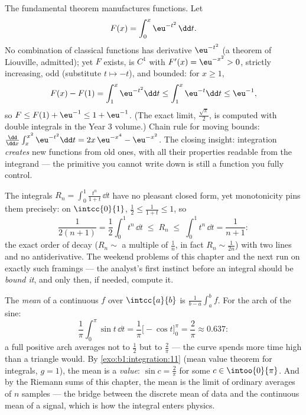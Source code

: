 \begin{example}\label{ex:b1:integration:definedby}
The fundamental theorem manufactures functions. Let
\[
F(x) = \int_0^x \eu^{-t^2}\,\dd t .
\]
No combination of classical functions has derivative
$\eu^{-t^2}$ (a theorem of Liouville, admitted); yet $F$ exists,
is $C^1$ with $F'(x) = \eu^{-x^2} > 0$, strictly increasing, odd
(substitute $t \mapsto -t$), and bounded: for $x \geq 1$,
\[
F(x) - F(1) = \int_1^x \eu^{-t^2}\dd t
\leq \int_1^x \eu^{-t}\dd t \leq \eu^{-1} ,
\]
so $F \leq F(1) + \eu^{-1} \leq 1 + \eu^{-1}$. (The exact limit,
$\frac{\sqrt\pi}{2}$, is computed with double integrals in the
Year 3 volume.) Chain rule for moving bounds: $\frac{\dd}{\dd
x}\int_x^{x^2} \eu^{-t^2}\dd t = 2x\,\eu^{-x^4} - \eu^{-x^2}$.
The closing insight: integration \emph{creates} new functions
from old ones, with all their properties readable from the
integrand --- the primitive you cannot write down is still a
function you fully control.
\end{example}

\begin{example}\label{ex:b1:integration:estimate}
The integrals $R_n = \int_0^1 \frac{t^n}{1 + t}\,\dd t$ have no
pleasant closed form, yet monotonicity pins them precisely: on
$\intcc{0}{1}$, $\frac12 \leq \frac{1}{1+t} \leq 1$, so
\[
\frac{1}{2(n+1)} = \frac12\int_0^1 t^n\,\dd t
\;\leq\; R_n \;\leq\; \int_0^1 t^n \,\dd t = \frac{1}{n+1} :
\]
the exact order of decay ($R_n \sim$ a multiple of $\frac1n$,
in fact $R_n \sim \frac{1}{2n}$) with two lines and no
antiderivative. The weekend problems of this chapter and the
next run on exactly such framings --- the analyst's first
instinct before an integral should be \emph{bound it}, and only
then, if needed, compute it.
\end{example}

\begin{example}\label{ex:b1:integration:average}
The \emph{mean} of a continuous $f$ over $\intcc{a}{b}$ is
$\frac{1}{b-a}\int_a^b f$. For the arch of the sine:
\[
\frac{1}{\pi}\int_0^\pi \sin t\,\dd t
= \frac{1}{\pi}\bigl[-\cos t\bigr]_0^\pi = \frac{2}{\pi}
\approx 0.637 :
\]
a full positive arch averages not to $\frac12$ but to
$\frac2\pi$ --- the curve spends more time high than a triangle
would. By \cref{exo:b1:integration:11} (mean value theorem for
integrals, $g = 1$), the mean is a \emph{value}: $\sin c =
\frac2\pi$ for some $c \in \intoo{0}{\pi}$. And by the Riemann
sums of this chapter, the mean is the limit of ordinary
averages of $n$ samples --- the bridge between the discrete
mean of data and the continuous mean of a signal, which is how
the integral enters physics.
\end{example}

